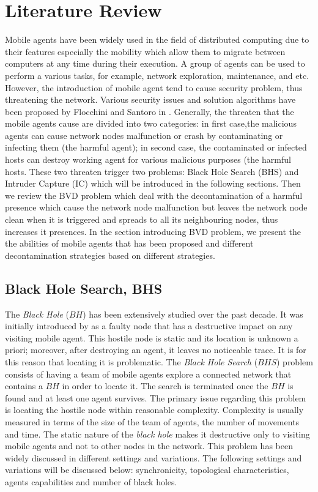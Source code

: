 \chapter {Literature Review}
\label{RW}
Mobile agents have been widely used in the field of distributed computing due to their features especially the mobility which allow them to migrate between computers at any time during their execution. A group of agents can be used to perform a various tasks, for example, network exploration, maintenance, and etc. However, the introduction of mobile agent tend to cause security problem, thus threatening the network. Various security issues and solution algorithms have been proposed by Flocchini and Santoro in \cite{security}. Generally, the threaten that the mobile agents cause are divided into two categories: in first case,the malicious agents can cause network nodes malfunction or crash by contaminating or infecting them (the harmful agent); in second case, the contaminated or infected hosts can destroy working agent for various malicious purposes (the harmful hosts. These two threaten trigger two problems: Black Hole Search (BHS) and Intruder Capture (IC) which will be introduced in the following sections. Then we review the BVD problem which deal with the decontamination of a harmful presence which cause the network node malfunction but leaves the network node clean when it is triggered and spreads to all its neighbouring nodes, thus increases it presences. In the section introducing BVD problem, we present the the abilities of mobile agents that has been proposed and different decontamination strategies based on different strategies.

\section{Black Hole Search, BHS}
The {\it Black Hole} ($BH$) has been extensively studied over the past decade. It was initially introduced by \cite{dobetal8} as a faulty node that has a destructive impact on any visiting mobile agent. This hostile node is static and its location is unknown a priori; moreover, after destroying an agent, it leaves no noticeable trace. It is for this reason that locating it is problematic.
The {\it Black Hole Search} ($BHS$) problem consists of having a team of mobile agents explore   a connected network that contains a $BH$  in order to locate  it. The search is terminated once the $BH$ is found and at least one agent survives.
The primary issue regarding this problem is locating the hostile node within reasonable complexity. Complexity is usually measured in terms of the size of the team of agents, the number of movements and time.
The static nature of the {\it black hole} makes it destructive only to visiting mobile agents and not to other nodes in the network.  This problem has been widely discussed in different settings and variations. The following settings and variations will be discussed below: synchronicity, topological characteristics, agents capabilities and number of black holes.

